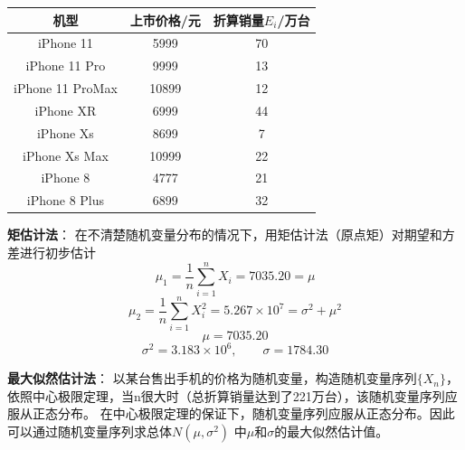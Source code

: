 \documentclass[12pt]{ctexart}
\begin{document}
            
        \begin{center}
            \begin{tabular}{|c|c|c|}
                \hline
                机型 & 上市价格/元 &折算销量$E _i$/万台\\
                \hline
                iPhone 11 &5999 &70\\
                \hline
                iPhone 11 Pro&9999 &13\\
                \hline
                iPhone 11 ProMax&10899 &12\\
                \hline
                iPhone XR  &6999  &44\\
                \hline
                iPhone Xs &8699 &7\\
                \hline
                iPhone Xs Max&10999 &22\\
                \hline
                iPhone 8 &4777&21\\
                \hline
                iPhone 8 Plus &6899&32\\
                \hline
            \end{tabular}
        \end{center}

        \textbf{矩估计法}：
        在不清楚随机变量分布的情况下，用矩估计法（原点矩）对期望和方差进行初步估计
        \begin{equation} %
            \mu _1= \frac{1}{n} \sum_ {i=1}^{n} X _i = 7035.20 =\mu
        \end{equation} 
        \begin{equation} %
            \mu _2= \frac{1}{n} \sum_ {i=1}^{n} X _i^2 = 5.267 \times 10^7=\sigma ^2 + \mu ^2
        \end{equation} 
        \begin{equation} %
            \mu = 7035.20 
        \end{equation} 
        \begin{equation} %
            \sigma ^2 = 3.183\times 10^6,\qquad \sigma = 1784.30
        \end{equation} 
        
        \newpage
        \textbf{最大似然估计法}：
        以某台售出手机的价格为随机变量，构造随机变量序列$\{X _n\}$，依照中心极限定理，当n很大时（总折算销量达到了221万台），该随机变量序列应服从正态分布。
    在中心极限定理的保证下，随机变量序列应服从正态分布。因此可以通过随机变量序列求总体$N(\mu, \sigma^2)$ 中$\mu$和$\sigma$的最大似然估计值。
\end{document}
